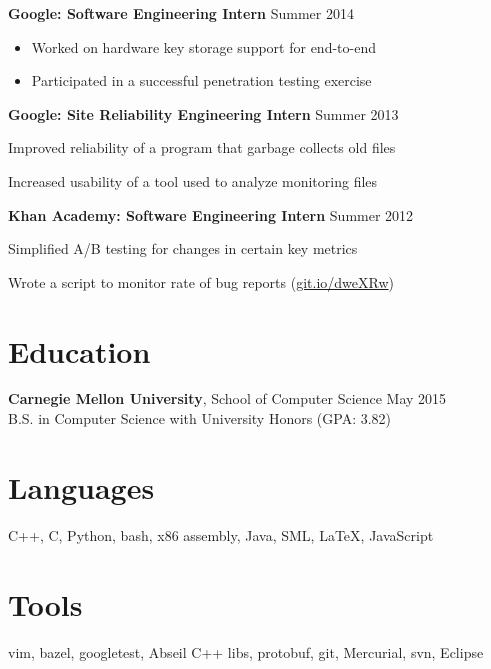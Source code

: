 \documentclass[margin]{res}
\begin{document}
\begin{resume}
  \textbf{Google: Software Engineering Intern} \hfill Summer 2014
  \begin{minipage}{0.84\textwidth}
    \vspace{0.2em}
    \begin{itemize}
      \item Worked on hardware key storage support for end-to-end
      \item Participated in a successful penetration testing exercise
    \end{itemize}
  \end{minipage}

  \textbf{Google: Site Reliability Engineering Intern}
    \hfill Summer 2013
  \begin{itemize}
    \vspace{0.2em}
    \begin{minipage}{0.84\textwidth}
      \item Improved reliability of a program that garbage collects old files
      \item Increased usability of a tool used to analyze monitoring files
    \end{minipage}
  \end{itemize}

  \textbf{Khan Academy: Software Engineering Intern} \hfill Summer 2012
  \begin{itemize}
    \vspace{0.2em}
    \begin{minipage}{0.84\textwidth}
      \item Simplified A/B testing for changes in certain key metrics
      \item Wrote a script to monitor rate of bug reports
        (\href{https://github.com/Khan/beep-boop}{git.io/dweXRw})
    \end{minipage}
  \end{itemize}

\section{Education}
  \textbf{Carnegie Mellon University}, School of Computer Science
    \hfill May 2015\\
  B.S. in Computer Science with University Honors (GPA: 3.82)

\section{Languages}
  C++, C, Python, bash, x86 assembly, Java, SML, \LaTeX, JavaScript

\section{Tools}
  vim, bazel, googletest, Abseil C++ libs, protobuf, git, Mercurial, svn, Eclipse

\end{resume}
\end{document}
